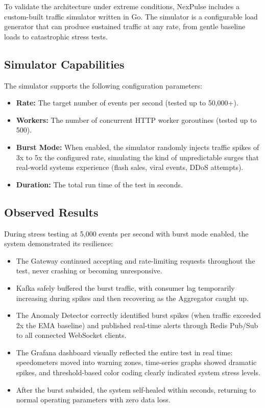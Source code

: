 \documentclass[12pt,a4paper]{article}
\begin{document}
To validate the architecture under extreme conditions, NexPulse includes a custom-built traffic simulator written in Go. The simulator is a configurable load generator that can produce sustained traffic at any rate, from gentle baseline loads to catastrophic stress tests.

\subsection{Simulator Capabilities}

The simulator supports the following configuration parameters:

\begin{itemize}[leftmargin=2em]
    \item \textbf{Rate:} The target number of events per second (tested up to 50,000+).
    \item \textbf{Workers:} The number of concurrent HTTP worker goroutines (tested up to 500).
    \item \textbf{Burst Mode:} When enabled, the simulator randomly injects traffic spikes of 3x to 5x the configured rate, simulating the kind of unpredictable surges that real-world systems experience (flash sales, viral events, DDoS attempts).
    \item \textbf{Duration:} The total run time of the test in seconds.
\end{itemize}

\subsection{Observed Results}

During stress testing at 5,000 events per second with burst mode enabled, the system demonstrated its resilience:

\begin{itemize}[leftmargin=2em]
    \item The Gateway continued accepting and rate-limiting requests throughout the test, never crashing or becoming unresponsive.
    \item Kafka safely buffered the burst traffic, with consumer lag temporarily increasing during spikes and then recovering as the Aggregator caught up.
    \item The Anomaly Detector correctly identified burst spikes (when traffic exceeded 2x the EMA baseline) and published real-time alerts through Redis Pub/Sub to all connected WebSocket clients.
    \item The Grafana dashboard visually reflected the entire test in real time: speedometers moved into warning zones, time-series graphs showed dramatic spikes, and threshold-based color coding clearly indicated system stress levels.
    \item After the burst subsided, the system self-healed within seconds, returning to normal operating parameters with zero data loss.
\end{itemize}
\end{document}
